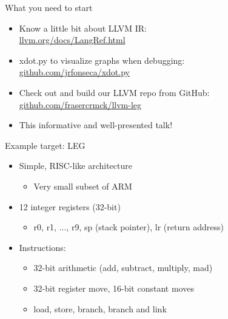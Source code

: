 
\begin{frame}{What you need to start}

\begin{itemize}
    \item Know a little bit about LLVM IR: \\ \url{llvm.org/docs/LangRef.html}
    \item xdot.py to visualize graphs when debugging: \\ \url{github.com/jrfonseca/xdot.py}
    \item Check out and build our LLVM repo from GitHub: \\ \url{github.com/frasercrmck/llvm-leg}
    \item This informative and well-presented talk!
\end{itemize}

\end{frame}


\begin{frame}{Example target: LEG}

\begin{itemize}
    \item Simple, RISC-like architecture
    \begin{itemize}
        \item Very small subset of ARM
    \end{itemize}
    \item 12 integer registers (32-bit)
    \begin{itemize}
        \item r0, r1, ..., r9, sp (stack pointer), lr (return address)
    \end{itemize}
    \item Instructions:
    \begin{itemize}
        \item 32-bit arithmetic (add, subtract, multiply, mad)
        \item 32-bit register move, 16-bit constant moves
        \item load, store, branch, branch and link
    \end{itemize}
\end{itemize}

\end{frame}

